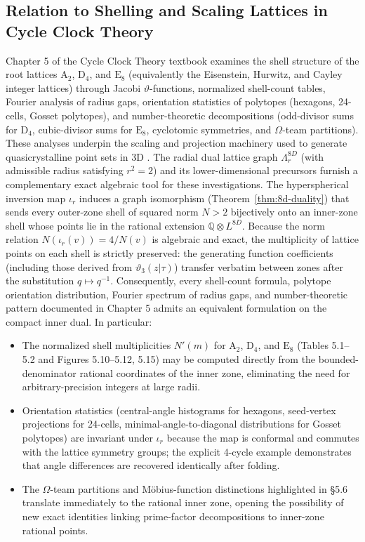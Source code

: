 \documentclass{article}
\begin{document}
\subsection{Relation to Shelling and Scaling Lattices in Cycle Clock Theory}
Chapter 5 of the Cycle Clock Theory textbook examines the shell structure of the root lattices \(\mathrm{A}_2\), \(\mathrm{D}_4\), and \(\mathrm{E}_8\) (equivalently the Eisenstein, Hurwitz, and Cayley integer lattices) through Jacobi \(\vartheta\)-functions, normalized shell-count tables, Fourier analysis of radius gaps, orientation statistics of polytopes (hexagons, 24-cells, Gosset polytopes), and number-theoretic decompositions (odd-divisor sums for \(\mathrm{D}_4\), cubic-divisor sums for \(\mathrm{E}_8\), cyclotomic symmetries, and \(\Omega\)-team partitions). These analyses underpin the scaling and projection machinery used to generate quasicrystalline point sets in 3D \cite{SadocMosseri1999}.
The radial dual lattice graph \(\Lambda_r^{8D}\) (with admissible radius satisfying \(r^2=2\)) and its lower-dimensional precursors furnish a complementary exact algebraic tool for these investigations. The hyperspherical inversion map \(\iota_r\) induces a graph isomorphism (Theorem~\ref{thm:8d-duality}) that sends every outer-zone shell of squared norm \(N > 2\) bijectively onto an inner-zone shell whose points lie in the rational extension \(\mathbb{Q} \otimes L^{8D}\). Because the norm relation \(N(\iota_r(v)) = 4/N(v)\) is algebraic and exact, the multiplicity of lattice points on each shell is strictly preserved: the generating function coefficients (including those derived from \(\vartheta_3(z|\tau)\)) transfer verbatim between zones after the substitution \(q \mapsto q^{-1}\).
Consequently, every shell-count formula, polytope orientation distribution, Fourier spectrum of radius gaps, and number-theoretic pattern documented in Chapter 5 admits an equivalent formulation on the compact inner dual. In particular:
\begin{itemize}
  \item The normalized shell multiplicities \(N'(m)\) for \(\mathrm{A}_2\), \(\mathrm{D}_4\), and \(\mathrm{E}_8\) (Tables 5.1--5.2 and Figures 5.10--5.12, 5.15) may be computed directly from the bounded-denominator rational coordinates of the inner zone, eliminating the need for arbitrary-precision integers at large radii.
  \item Orientation statistics (central-angle histograms for hexagons, seed-vertex projections for 24-cells, minimal-angle-to-diagonal distributions for Gosset polytopes) are invariant under \(\iota_r\) because the map is conformal and commutes with the lattice symmetry groups; the explicit 4-cycle example demonstrates that angle differences are recovered identically after folding.
  \item The \(\Omega\)-team partitions and Möbius-function distinctions highlighted in §5.6 translate immediately to the rational inner zone, opening the possibility of new exact identities linking prime-factor decompositions to inner-zone rational points.
\end{itemize}
\end{document}
